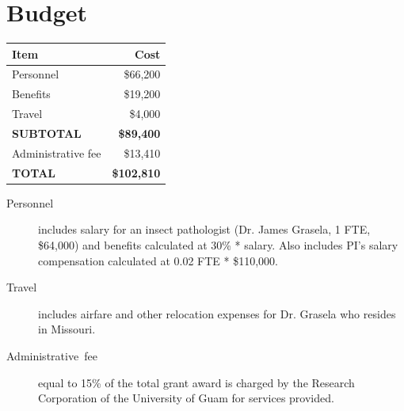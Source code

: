\documentclass[12pt,letterpaper,english,bibliography=totocnumbered, abstract=on]{scrartcl}
\begin{document}
\newpage
\section{Budget}

\begin{center}
\begin{tabular}{lr}
\hline 
\textbf{Item}      & \textbf{Cost}\\
\hline 
Personnel          & \$66,200 \\
Benefits           &  \$19,200 \\
Travel             &   \$4,000 \\
\hline 
\textbf{SUBTOTAL}  & \textbf{\$89,400} \\
\hline
Administrative fee & \$13,410 \\
\hline 
\textbf{TOTAL}	   & \textbf{\$102,810} \\
\hline 
\end{tabular} 
\par\end{center}

\begin{description}
	
\item [{Personnel}] includes salary for an insect pathologist (Dr. James Grasela, 1 FTE, \$64,000) and benefits calculated at 30\% * salary. Also includes PI's salary compensation calculated at 0.02 FTE * \$110,000.

\item [{Travel}] includes airfare and other relocation expenses for Dr. Grasela who resides in Missouri.

\item [{Administrative~fee}] equal to 15\% of the total grant award
is charged by the Research Corporation of the University of Guam for
services provided.

\end{description}

\newpage
\printbibliography

\newpage{}

%
\end{document}
